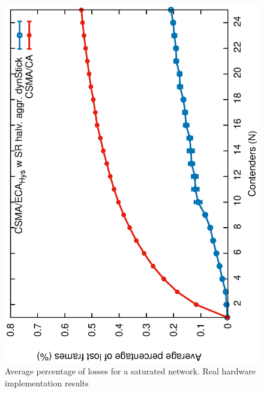 	\begin{figure}[tb]
		\centering
		\includegraphics[width=0.7\linewidth,angle=-90]{figures/tonFigs/losses-sat-SR-IMPLEMENTATION.eps}
		\caption{Average percentage of losses for a saturated network. Real hardware implementation results}
		\label{fis:lossesImplementation}
	\end{figure}


